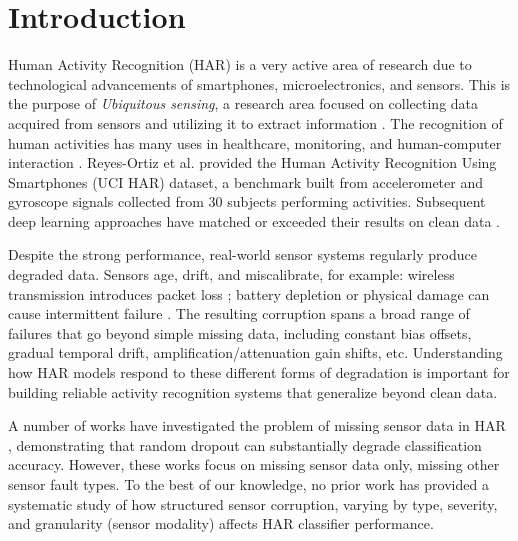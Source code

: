 \section{Introduction}


Human Activity Recognition (HAR) is a very active area of research due to technological
advancements of smartphones, microelectronics, and sensors. This is the purpose of
\textit{Ubiquitous sensing}, a research area focused on collecting data acquired from sensors and
utilizing it to extract information \cite{lara-2013}. The recognition of human activities has
many uses in healthcare, monitoring, and human-computer interaction \cite{lara-2013}.
Reyes-Ortiz et al. \cite{reyes-ortiz-2013} provided the Human Activity Recognition Using
Smartphones (UCI HAR) dataset, a benchmark built from accelerometer and gyroscope signals collected
from 30 subjects performing activities. Subsequent deep learning approaches have matched or
exceeded their results on clean data \cite{ronao-2016}.

Despite the strong performance, real-world sensor systems regularly produce degraded data. Sensors
age, drift, and miscalibrate, for example: wireless transmission introduces packet loss
\cite{ni-2009}; battery depletion or physical damage can cause intermittent failure \cite{ni-2009}.
The resulting corruption spans a broad range of failures that go beyond simple missing data,
including constant bias offsets, gradual temporal drift, amplification/attenuation gain shifts,
etc. Understanding how HAR models respond to these different forms of degradation is important for
building reliable activity recognition systems that generalize beyond clean data.

A number of works have investigated the problem of missing sensor data in HAR \cite{hossain-2018,
hossain-2020, saha-2025}, demonstrating that random dropout can substantially degrade
classification accuracy. However, these works focus on missing sensor data only, missing other
sensor fault types. To the best of our knowledge, no prior work has provided a systematic study of
how structured sensor corruption, varying by type, severity, and granularity (sensor modality)
affects HAR classifier performance.


